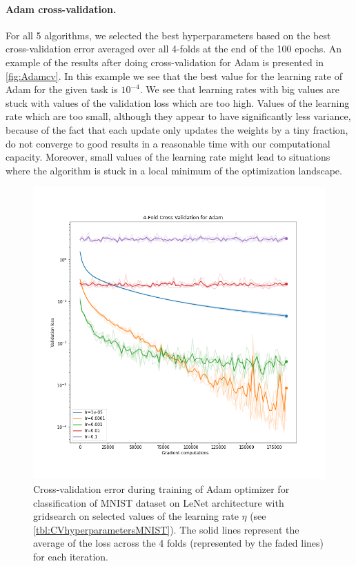 \documentclass[a4paper,11pt,oneside]{report}
\begin{document}
\paragraph{Adam cross-validation.}
For all 5 algorithms, we selected the best hyperparameters based on the best cross-validation error averaged over all 4-folds at the end of the 100 epochs. An example of the results after doing cross-validation for Adam is presented in \autoref{fig:Adamcv}. In this example we see that the best value for the learning rate of Adam for the given task is $10^{-4}$. We see that learning rates with big values are stuck with values of the validation loss which are too high. Values of the learning rate which are too small, although they appear to have significantly less variance, because of the fact that each update only updates the weights by a tiny fraction, do not converge to good results in a reasonable time with our computational capacity. Moreover, small values of the learning rate might lead to situations where the algorithm is stuck in a local minimum of the optimization landscape. 

\begin{figure}
    \centering
    \includegraphics[width=.75\columnwidth]{midterm presentation/images/AdamCV.png}
    \caption{Cross-validation error during training of Adam optimizer for classification of MNIST dataset on LeNet architecture with gridsearch on selected values of the learning rate $\eta$ (see \autoref{tbl:CVhyperparametersMNIST}). The solid lines represent the average of the loss across the 4 folds (represented by the faded lines) for each iteration.}
    \label{fig:Adamcv}
\end{figure}
\end{document}
